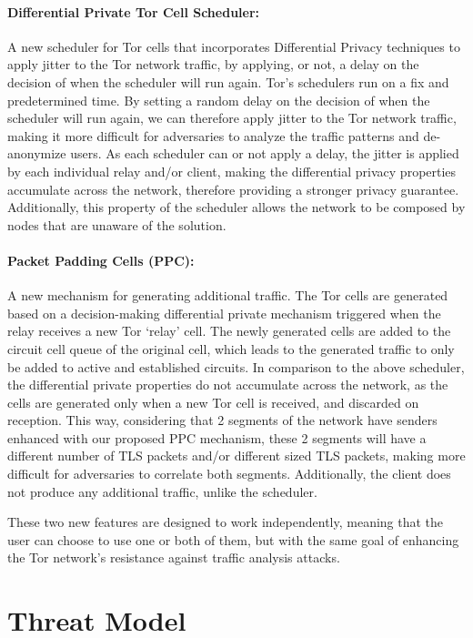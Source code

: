 \paragraph{Differential Private Tor Cell Scheduler:} A new scheduler for Tor cells that incorporates Differential Privacy techniques to apply jitter to the Tor network traffic, by applying, or not, a delay on the decision of when the scheduler will run again. Tor's schedulers run on a fix and predetermined time. By setting a random delay on the decision of when the scheduler will run again, we can therefore apply jitter to the Tor network traffic, making it more difficult for adversaries to analyze the traffic patterns and de-anonymize users. As each scheduler can or not apply a delay, the jitter is applied by each individual relay and/or client, making the differential privacy properties accumulate across the network, therefore providing a stronger privacy guarantee. Additionally, this property of the scheduler allows the network to be composed by nodes that are unaware of the solution.
\paragraph{Packet Padding Cells (PPC):} A new mechanism for generating additional traffic. The Tor cells are generated based on a decision-making differential private mechanism triggered when the relay receives a new Tor `relay' cell. The newly generated cells are added to the circuit cell queue of the original cell, which leads to the generated traffic to only be added to active and established circuits.  In comparison to the above scheduler, the differential private properties do not accumulate across the network, as the cells are generated only when a new Tor cell is received, and discarded on reception. This way, considering that 2 segments of the network have senders enhanced with our proposed PPC mechanism, these 2 segments will have a different number of TLS packets and/or different sized TLS packets, making more difficult for adversaries to correlate both segments. Additionally, the client does not produce any additional traffic, unlike the scheduler.

These two new features are designed to work independently, meaning that the user can choose to use one or both of them, but with the same goal of enhancing the Tor network's resistance against traffic analysis attacks.


\section{Threat Model}\label{sec:threat_model}


